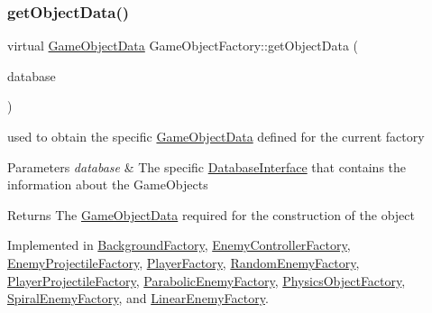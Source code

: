 \mbox{\label{class_game_object_factory_ae9358fbb3ef2d3b127320341760d3ff9}} 
\subsubsection{\texorpdfstring{get\+Object\+Data()}{getObjectData()}}
{\footnotesize\ttfamily virtual \hyperlink{struct_game_object_data}{Game\+Object\+Data} Game\+Object\+Factory\+::get\+Object\+Data (\begin{DoxyParamCaption}\item[{const std\+::shared\+\_\+ptr$<$ \hyperlink{class_database_interface}{Database\+Interface} $>$ \&}]{database }\end{DoxyParamCaption})\hspace{0.3cm}{\ttfamily [pure virtual]}}



used to obtain the specific \hyperlink{struct_game_object_data}{Game\+Object\+Data} defined for the current factory 


\begin{DoxyParams}{Parameters}
{\em database} & The specific \hyperlink{class_database_interface}{Database\+Interface} that contains the information about the Game\+Objects \\
\hline
\end{DoxyParams}
\begin{DoxyReturn}{Returns}
The \hyperlink{struct_game_object_data}{Game\+Object\+Data} required for the construction of the object 
\end{DoxyReturn}


Implemented in \hyperlink{class_background_factory_aed13815bcb56568c4b465b5a531ee053}{Background\+Factory}, \hyperlink{class_enemy_controller_factory_a27d4819c1174490c22f2e111f32ca2ec}{Enemy\+Controller\+Factory}, \hyperlink{class_enemy_projectile_factory_a1ef660e5962f29b7353054c6480477c7}{Enemy\+Projectile\+Factory}, \hyperlink{class_player_factory_aca4e809430541d77acd4c588c4381715}{Player\+Factory}, \hyperlink{class_random_enemy_factory_a7c007b44a5e5e59fecc0b8cd2a6a9dc3}{Random\+Enemy\+Factory}, \hyperlink{class_player_projectile_factory_a702ae964c9dc653140fad4e17f38f60a}{Player\+Projectile\+Factory}, \hyperlink{class_parabolic_enemy_factory_acc62c48a8eb5af162910dc48d9fe8900}{Parabolic\+Enemy\+Factory}, \hyperlink{class_physics_object_factory_aa59f52d3adc1fac676f4a8a3c2de9ba9}{Physics\+Object\+Factory}, \hyperlink{class_spiral_enemy_factory_a230709a0781c4364aa062b0bd441ec4d}{Spiral\+Enemy\+Factory}, and \hyperlink{class_linear_enemy_factory_a9d959b8a414e30ad4813d5d3740eafee}{Linear\+Enemy\+Factory}.



